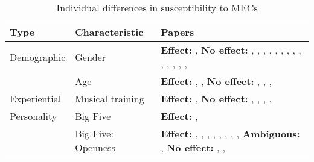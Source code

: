 \begin{table}[t!]
\centering
\scriptsize
\def\arraystretch{1.2}

\begin{threeparttable}
\caption{Individual differences in susceptibility to MECs}
\label{tab:rev-6}

\begin{tabular*}{\textwidth}{
    >{\raggedright}p{}
    >{\raggedright}p{}
    >{\raggedright\arraybackslash}p{}}

\hline

\textbf{Type} & \textbf{Characteristic} & \textbf{Papers} \\ 

\hline
Demographic & Gender & 
    \textbf{Effect:} \textcite{benedek2011}, \textcite{panksepp1995} 
    \newline 
    \textbf{No effect:} \textcite{bannister2019}, \textcite{grewe2007}, \textcite{grewe2009a}, \textcite{guhn2007}, \textcite{goldstein1980}, \textcite{harrison2016}, \textcite{mlejnek2013}, \textcite{mori2014b}, \textcite{polo2017}, \textcite{rickard2004}, \textcite{silvia2011}, \textcite{starcke2019}, \textcite{sutherland2009}, \textcite{williams2018}, \textcite{zickfeld2019a} \\ 

\cline{2-3}   
& Age & 
    \textbf{Effect:} \textcite{baltes2014}, \textcite{mlejnek2013}, \textcite{williams2018} 
    \newline 
    \textbf{No effect:} \textcite{grewe2009a}, \textcite{mori2014b}, \textcite{starcke2019}, \textcite{zickfeld2019a} \\

\hline
Experiential & Musical training & 
    \textbf{Effect:} \textcite{beier2020}, \textcite{nusbaum2011} 
    \newline 
    \textbf{No effect:} \textcite{bannister2018}, \textcite{grewe2009a}, \textcite{guhn2007}, \textcite{polo2017}, \textcite{rickard2004} \\

\hline
Personality & Big Five & 
    \textbf{Effect:} \textcite{nusbaum2011}, \textcite{silvia2011} \\

\cline{2-3}
& Big Five: Openness & 
    \textbf{Effect:} \textcite{bannister2020a}, \textcite{colver2016}, \textcite{maruskin2012}, \textcite{mccrae2007}, \textcite{mori2015}, \textcite{nusbaum2011}, \textcite{silvia2011}, \textcite{silvia2015}, \textcite{sumpf2015} 
    \newline 
    \textbf{Ambiguous:} \textcite{mori2015}, \textcite{sumpf2015} 
    \newline 
    \textbf{No effect:} \textcite{mathis2017}, \textcite{rickard2004}, \textcite{starcke2019} \\ 
    

\end{tabular*}
\end{threeparttable}
\end{table}
